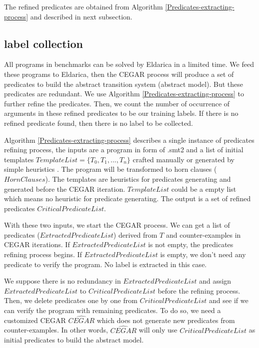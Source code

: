 \documentclass{article}
\begin{document}
The refined predicates are obtained from Algorithm \ref{Predicates-extracting-process} and described in next subsection.



\subsection{label collection}
All programs in benchmarks can be solved by Eldarica in a limited time. We feed these programs to Eldarica, then the CEGAR process will produce a set of predicates to build the abstract transition system (abstract model). But these predicates are redundant. We use Algorithm \ref{Predicates-extracting-process} to further refine the predicates. Then, we count the number of occurrence of arguments in these refined predicates to be our training labels. If there is no refined predicate found, then there is no label to be collected.

Algorithm \ref{Predicates-extracting-process} describes a single instance of predicates refining process, the inputs are a program in form of .smt2 and a list of initial templates $TemplateList=\{T_{0},T_{1},...,T_{n}\}$ crafted manually \cite{10.1007/978-3-319-57288-8_18} or generated by simple heuristics\cite{Leroux2016} . The program will be transformed to horn clauses ($HornClauses$). The templates are heuristics for predicates generating and generated before the CEGAR iteration. $TemplateList$ could be a empty list which means no heuristic for predicate generating. The output is a set of refined predicates $CriticalPredicateList$.

With these two inputs, we start the CEGAR process. We can get a list of predicates ($ExtractedPredicateList$) derived from $T$ and counter-examples in CEGAR iterations. If $ExtractedPredicateList$ is not empty, the predicates refining process begins. If $ExtractedPredicateList$ is empty, we don't need any predicate to verify the program. No label is extracted in this case.

We suppose there is no redundancy in $ExtractedPredicateList$ and assign $ExtractedPredicateList$ to $CriticalPredicateList$ before the refining process. Then, we delete predicates one by one from $CriticalPredicateList$ and see if we can verify the program with remaining predicates. To do so, we need a customized CEGAR $\widehat{CEGAR}$ which does not generate new predicates from counter-examples. In other words, $\widehat{CEGAR}$ will only use $CriticalPredicateList$ as initial predicates to build the abstract model.
\end{document}
